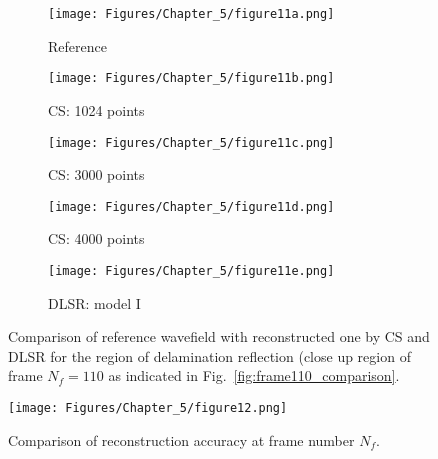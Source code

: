 \begin{figure} [h!]
	\centering
	\begin{subfigure}[b]{0.32\textwidth}
		\centering
		\texttt{[image: Figures/Chapter\_5/figure11a.png]}
		\caption{Reference}
		\label{fig:frame110delam_ref}
	\end{subfigure}
	\hfill
	\begin{subfigure}[b]{0.32\textwidth}
		\centering
		\texttt{[image: Figures/Chapter\_5/figure11b.png]}
		\caption{CS: 1024 points}
		\label{fig:frame110delam_CS1024}
	\end{subfigure}
	\hfill
	\begin{subfigure}[b]{0.32\textwidth}
		\centering
		\texttt{[image: Figures/Chapter\_5/figure11c.png]}
		\caption{CS: 3000 points}
		\label{fig:frame110delam_CS3000}
	\end{subfigure}	
	\hfill
	\begin{subfigure}[b]{0.32\textwidth}
		\centering
		\texttt{[image: Figures/Chapter\_5/figure11d.png]}
		\caption{CS: 4000 points}
		\label{fig:frame110delam_CS4000}
	\end{subfigure}
	\begin{subfigure}[b]{0.32\textwidth}
		\centering
		\texttt{[image: Figures/Chapter\_5/figure11e.png]}
		\caption{DLSR: model I}
		\label{fig:frame110delam_Abdalraheem}
	\end{subfigure}
	\caption{Comparison of reference wavefield with reconstructed one by CS and DLSR for the region of delamination reflection (close up region of frame $N_f = 110$ as indicated in Fig.~\ref{fig:frame110_comparison}.}
	\label{fig:frame110del_comparison}
\end{figure} 
\clearpage
\begin{figure} [h!]
	\centering
	\texttt{[image: Figures/Chapter\_5/figure12.png]}
	\caption{Comparison of reconstruction accuracy at frame number $N_f$.}
	\label{fig:frame_metrics}
\end{figure}

